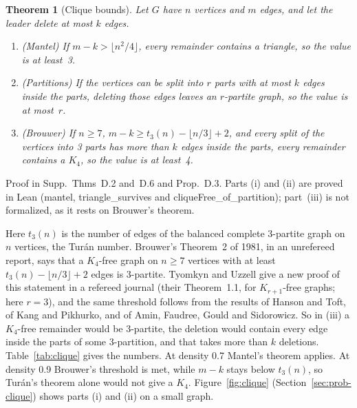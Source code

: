\documentclass[]{spie}  %
\theoremstyle{plain}
\newtheorem{thm}{Theorem}
\newcommand{\lean}[1]{\mbox{\ttfamily #1}}   %
\begin{document}
\begin{thm}[Clique bounds]\label{thm:clique}
Let $G$ have $n$ vertices and $m$ edges, and let the leader delete at most $k$ edges.
\begin{enumerate}
\item[(i)] (Mantel\cite{mantel1907problem}) If $m-k>\lfloor n^2/4\rfloor$, every remainder contains
a triangle, so the value is at least~3.
\item[(ii)] (Partitions) If the vertices can be split into $r$ parts with at most $k$ edges
inside the parts, deleting those edges leaves an $r$-partite graph, so the value is at most~$r$.
\item[(iii)] (Brouwer\cite{brouwer1981lotto,tyomkyn2015strong}) If $n\ge 7$,
$m-k\ge t_3(n)-\lfloor n/3\rfloor+2$, and every split of the vertices into 3 parts has more than
$k$ edges inside the parts, every remainder contains a $K_4$, so the value is at least~4.
\end{enumerate}
\end{thm}
\noindent Proof in Supp.\ Thms~D.2 and~D.6 and Prop.~D.3. Parts (i) and (ii) are proved in Lean
(\lean{mantel}, \lean{triangle\_survives} and \lean{cliqueFree\_of\_partition}); part~(iii) is
not formalized, as it rests on Brouwer's theorem.

Here $t_3(n)$ is the number of edges of the balanced complete 3-partite graph on $n$ vertices,
the Tur\'an number.\cite{turan1941extremal} Brouwer's Theorem~2 of 1981, in an unrefereed
report,\cite{brouwer1981lotto} says that a $K_4$-free graph on $n\ge 7$ vertices with at least
$t_3(n)-\lfloor n/3\rfloor+2$ edges is 3-partite. Tyomkyn and Uzzell give a new proof of this
statement in a refereed journal (their Theorem~1.1, for $K_{r+1}$-free graphs; here
$r=3$),\cite{tyomkyn2015strong} and the same threshold follows from the results of Hanson and
Toft, of Kang and Pikhurko, and of Amin, Faudree, Gould and
Sidorowicz.\cite{hanson1991ksaturated,kang2005maximum,amin2013non} So in (iii) a $K_4$-free remainder
would be 3-partite, the deletion would contain every edge inside the parts of some 3-partition,
and that takes more than $k$ deletions. Table~\ref{tab:clique} gives the numbers. At density 0.7
Mantel's theorem applies. At density 0.9 Brouwer's threshold is met, while $m-k$ stays below
$t_3(n)$, so Tur\'an's theorem alone would not give a $K_4$. Figure~\ref{fig:clique}
(Section~\ref{sec:prob-clique}) shows parts (i) and (ii) on a small graph.
\end{document}
